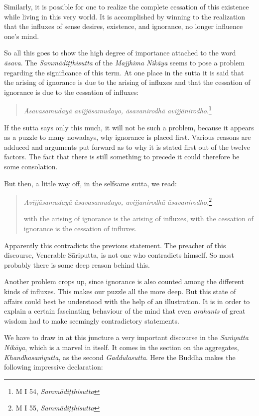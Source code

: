 Similarly, it is possible for one to realize the complete cessation of this existence while living in this very world. It is accomplished by winning to the realization that the influxes of sense desires, existence, and ignorance, no longer influence one's mind.

So all this goes to show the high degree of importance attached to the word \emph{āsava}. The \emph{Sammādiṭṭhisutta} of the \emph{Majjhima Nikāya} seems to pose a problem regarding the significance of this term. At one place in the sutta it is said that the arising of ignorance is due to the arising of influxes and that the cessation of ignorance is due to the cessation of influxes:

\begin{quote}
\emph{Āsavasamudayā avijjāsamudayo, āsavanirodhā avijjānirodho}.\footnote{M I 54, \emph{Sammādiṭṭhisutta}}
\end{quote}

If the sutta says only this much, it will not be such a problem, because it appears as a puzzle to many nowadays, why ignorance is placed first. Various reasons are adduced and arguments put forward as to why it is stated first out of the twelve factors. The fact that there is still something to precede it could therefore be some consolation.

But then, a little way off, in the selfsame sutta, we read:

\begin{quote}
\emph{Avijjāsamudayā āsavasamudayo, avijjanirodhā āsavanirodho,}\footnote{M I 55, \emph{Sammādiṭṭhisutta}}

with the arising of ignorance is the arising of influxes, with the cessation of ignorance is the cessation of influxes.
\end{quote}

Apparently this contradicts the previous statement. The preacher of this discourse, Venerable Sāriputta, is not one who contradicts himself. So most probably there is some deep reason behind this.

Another problem crops up, since ignorance is also counted among the different kinds of influxes. This makes our puzzle all the more deep. But this state of affairs could best be understood with the help of an illustration. It is in order to explain a certain fascinating behaviour of the mind that even \emph{arahants} of great wisdom had to make seemingly contradictory statements.

We have to draw in at this juncture a very important discourse in the \emph{Saṁyutta Nikāya}, which is a marvel in itself. It comes in the section on the aggregates, \emph{Khandhasaṁyutta}, as the second \emph{Gaddulasutta}. Here the Buddha makes the following impressive declaration:

